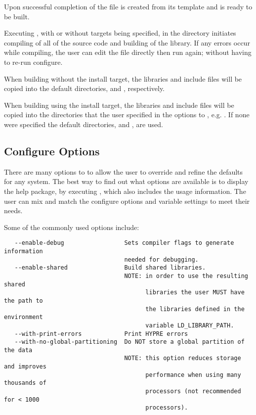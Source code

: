 Upon successful completion of  the file  
is created from its template  and \hypre{} is 
ready to be built.

Executing , with or without targets being specified, in the 
directory initiates compiling of all of the source code and building of the \hypre{} 
library.  If any errors occur while compiling, the user can edit the file 
 directly then run  again; without having to 
re-run configure.

When building \hypre{} without the install target, the libraries and include files 
will be copied into the default directories,  and 
, respectively.

When building \hypre{} using the install target, the libraries and include files 
will be copied into the directories that the user specified in the options to 
, e.g. .  If none were specified the default 
directories,  and , are used.


\subsection{Configure Options}\label{config_options}

There are many options to  to allow the user to override and 
refine the defaults for any system. The best way to find out what options are 
available is to display the help package, by executing , which 
also includes the usage information.  The user can mix and match the configure options 
and variable settings to meet their needs.

Some of the commonly used options include:

\begin{verbatim}
   --enable-debug                 Sets compiler flags to generate information 
                                  needed for debugging.
   --enable-shared                Build shared libraries.
                                  NOTE: in order to use the resulting shared 
                                        libraries the user MUST have the path to
                                        the libraries defined in the environment 
                                        variable LD_LIBRARY_PATH. 
   --with-print-errors            Print HYPRE errors
   --with-no-global-partitioning  Do NOT store a global partition of the data
                                  NOTE: this option reduces storage and improves
                                        performance when using many thousands of
                                        processors (not recommended for < 1000 
                                        processors).


\end{verbatim}

